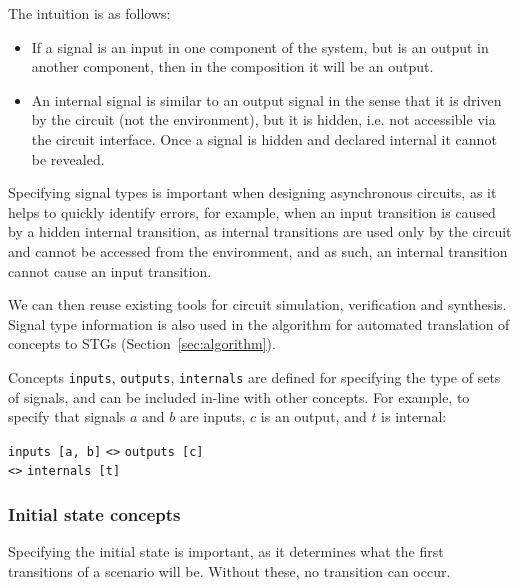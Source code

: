 \documentclass[british,conference,compsoc]{IEEEtran}
\begin{document}
The intuition is as follows:

\vspace{-2mm}
\begin{itemize}
    \item If a signal is an input in one component of the system, but is an
    output in another component, then in the composition it will be an output.
    \item An internal signal is similar to an output signal in the sense
    that it is driven by the circuit (not the environment), but it is hidden, 
    i.e. not accessible via the circuit interface. Once a signal is hidden and 
    declared internal it cannot be revealed.
\end{itemize}

\noindent Specifying signal types is important when designing asynchronous
circuits, as it helps to quickly identify errors, for example, when an input transition is
caused by a hidden internal transition, as internal transitions are used only by the circuit 
and cannot be accessed from the environment, and as such, an internal transition cannot
cause an input transition. 

We can then reuse existing tools for circuit
simulation, verification and synthesis. Signal type information is also used
in the algorithm for automated translation of concepts to
STGs (Section~\ref{sec:algorithm}).

Concepts \texttt{inputs}, \texttt{outputs}, \texttt{internals} are defined for
specifying the type of sets of signals, and can be included in-line
with other concepts. For example, to specify that signals $a$ and $b$ are 
inputs, $c$ is an output, and $t$ is internal:

\vspace{-2mm}

\begin{center}
\texttt{inputs [a, b]} \texttt{<>} \texttt{outputs [c]} \\
\texttt{<>} \texttt{internals [t]}
\end{center}

\vspace{-5mm}

\subsubsection{Initial state concepts\label{sub:initState}}

Specifying the initial state is important, as it determines what the first 
transitions of a scenario will be. Without these, no transition can occur.
\end{document}
